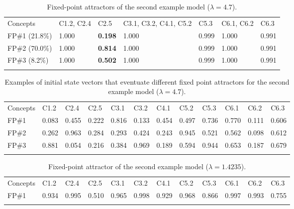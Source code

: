 \documentclass[graybox]{svmult}
\begin{document}
\begin{table}
\caption{Fixed-point attractors of the second example model ($\lambda = 4.7$).}
\label{tab:BP2Spartial47-FPs}
\begin{center}
\begin{tabular}{lllllll}
\hline\noalign{\smallskip}
Concepts & C1.2, C2.4 & C2.5 & C3.1, C3.2, C4.1, C5.2 & C5.3 & C6.1, C6.2 & C6.3\\
\noalign{\smallskip}\svhline\noalign{\smallskip}
FP\#1 (21.8\%)& 1.000 & \textbf{0.198} & 1.000 & 0.999 & 1.000 & 0.991\\
FP\#2 (70.0\%) & 1.000 & \textbf{0.814} & 1.000 & 0.999 & 1.000 & 0.991\\
FP\#3 (8.2\%) & 1.000 & \textbf{0.502} & 1.000 & 0.999 & 1.000 & 0.991\\
\noalign{\smallskip}\hline
\end{tabular}
\end{center}
\end{table}

\begin{table}
\caption{Examples of initial state vectors that eventuate different fixed point attractors for the second example model ($\lambda = 4.7$).}
\label{tab:BP2Spartial-scenarios}
\begin{center}
\begin{tabular}{llllllllllll}
\hline\noalign{\smallskip}
Concepts & C1.2 & C2.4 & C2.5 & C3.1 & C3.2 & C4.1 & C5.2 & C5.3 & C6.1 & C6.2 & C6.3\\
\noalign{\smallskip}\svhline\noalign{\smallskip}
FP\#1 & 0.083 & 0.455 & 0.222 & 0.816 & 0.133 & 0.454 & 0.497 & 0.736 & 0.770 & 0.111 & 0.606\\
FP\#2 & 0.262 & 0.963 & 0.284 & 0.293 & 0.424 & 0.243 & 0.945 & 0.521 & 0.562 & 0.098 & 0.612\\
FP\#3 & 0.881 & 0.054 & 0.216 & 0.384 & 0.969 & 0.189 & 0.594 & 0.944 & 0.653 & 0.187 & 0.679\\
\noalign{\smallskip}\hline
\end{tabular}
\end{center}
\end{table}

\begin{table}
\caption{Fixed-point attractor of the second example model ($\lambda = 1.4235$).}
\label{tab:BP2Spartial14235-FPs}
\begin{center}
\begin{tabular}{llllllllllll}
\hline\noalign{\smallskip}
Concepts & C1.2 & C2.4 & C2.5 & C3.1 & C3.2 & C4.1 & C5.2 & C5.3 & C6.1 & C6.2 & C6.3\\
\noalign{\smallskip}\svhline\noalign{\smallskip}
FP\#1 & 0.934 & 0.995 & 0.510 & 0.965 & 0.998 & 0.929 & 0.968 & 0.866 & 0.997 & 0.993 & 0.755\\
\noalign{\smallskip}\hline
\end{tabular}
\end{center}
\end{table}
\end{document}
